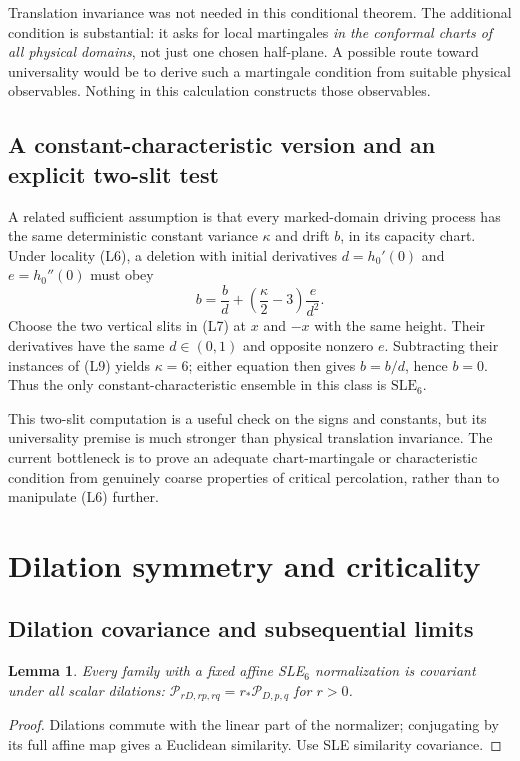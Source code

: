 \documentclass[11pt]{article}
\newtheorem{lemma}[theorem]{Lemma}
\theoremstyle{definition}\newtheorem{definition}[theorem]{Definition}
\theoremstyle{remark}\newtheorem{remark}[theorem]{Remark}
\begin{document}
Translation invariance was not needed in this conditional theorem.
The additional condition is substantial: it asks for local martingales
\emph{in the conformal charts of all physical domains}, not just one chosen
half-plane.  A possible route toward universality would be to derive such a
martingale condition from suitable physical observables.  Nothing in this
calculation constructs those observables.

\subsection{A constant-characteristic version and an explicit two-slit test}

A related sufficient assumption is that every marked-domain driving process
has the same deterministic constant variance $\kappa$ and drift $b$, in
its capacity chart.  Under locality (L6), a deletion with initial derivatives
$d=h_0'(0)$ and $e=h_0''(0)$ must obey
\[
 b=\frac b d+\left(\frac\kappa2-3\right)\frac e{d^2}.
 \tag{L9}
\]
Choose the two vertical slits in (L7) at $x$ and $-x$ with the same height.
Their derivatives have the same $d\in(0,1)$ and opposite nonzero $e$.
Subtracting their instances of (L9) yields $\kappa=6$; either equation then
gives $b=b/d$, hence $b=0$.  Thus the only constant-characteristic ensemble
in this class is $\mathrm{SLE}_6$.

This two-slit computation is a useful check on the signs and constants,
but its universality premise is much stronger than physical translation
invariance.  The current bottleneck is to prove an adequate chart-martingale
or characteristic condition from genuinely coarse properties of critical
percolation, rather than to manipulate (L6) further.

\section{Dilation symmetry and criticality}
\subsection{Dilation covariance and subsequential limits}

\begin{lemma}
\label{lem:am-scaleaffine}
Every family with a fixed affine SLE$_6$ normalization is covariant under
all scalar dilations:
$\mathcal P_{rD,rp,rq}=r_*\mathcal P_{D,p,q}$ for $r>0$.
\end{lemma}
\begin{proof}
Dilations commute with the linear part of the normalizer; conjugating by
its full affine map gives a Euclidean similarity. Use SLE similarity covariance.
\end{proof}
\end{document}
